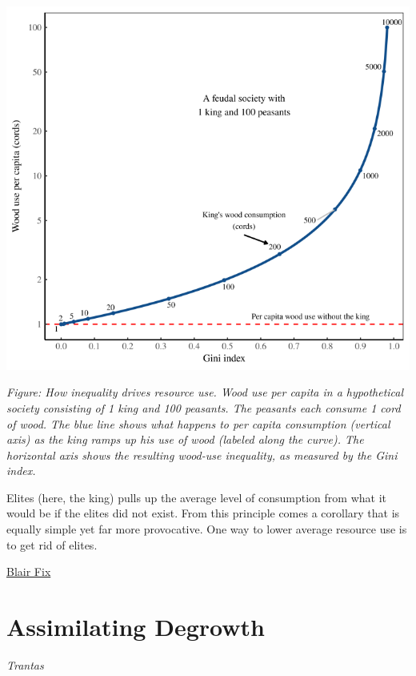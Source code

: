 \documentclass[
]{book}
\begin{document}
\includegraphics{fig/fix_kingdom.png}

\emph{Figure: How inequality drives resource use.
Wood use per capita in a hypothetical society consisting of 1 king and 100 peasants.
The peasants each consume 1 cord of wood.
The blue line shows what happens to per capita consumption (vertical axis)
as the king ramps up his use of wood (labeled along the curve).
The horizontal axis shows the resulting wood-use inequality, as measured by the Gini index.}

Elites (here, the king) pulls up the average level of consumption from
what it would be if the elites did not exist.
From this principle comes a corollary that is equally simple yet far more provocative.
One way to lower average resource use is to get rid of elites.

\href{https://economicsfromthetopdown.com/2021/02/26/radically-progressive-degrowth-reducing-resource-use-by-eliminating-inequality/}{Blair Fix}

\hypertarget{assimilating-degrowth}{%
\section{Assimilating Degrowth}\label{assimilating-degrowth}}

\emph{Trantas}
\end{document}
